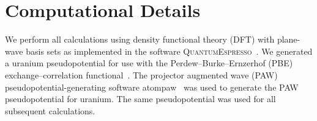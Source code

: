 


\section{Computational Details}\label{sec_comp}
We perform all calculations using density functional theory (DFT) with
plane-wave basis sets as implemented in the software
\textsc{QuantumEspresso}~\cite{giannozzi2009quantum}. We generated a uranium
pseudopotential for use with the Perdew--Burke--Ernzerhof (PBE)
exchange--correlation functional~\cite{Perdew1996b,Perdew1997}.
The projector augmented wave (PAW) pseudopotential-generating software
atompaw~\cite{holzwarth2001projector,tackett2001projector} was used to generate
the PAW pseudopotential for uranium. The same pseudopotential was used for all
subsequent calculations.

